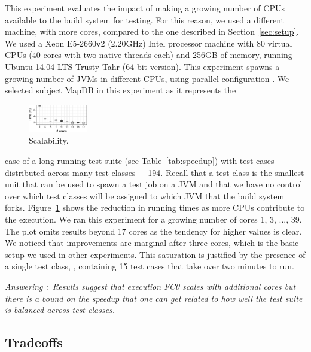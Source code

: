 \documentclass[10pt,journal,compsoc]{IEEEtran}
\begin{document}
\newcommand{\subjectScalability}{MapDB}

This experiment evaluates the impact of making a growing number of
CPUs available to the build system for testing.  For this reason, we
used a different machine, with more cores, compared to the one described in
Section~\ref{sec:setup}.  We used a Xeon E5-2660v2 (2.20GHz) Intel
processor machine with 80 virtual CPUs (40 cores with two native
threads each) and 256GB of memory, running Ubuntu 14.04 LTS Trusty
Tahr (64-bit version). This experiment
spawns a growing number of JVMs in different CPUs, using parallel
configuration \emph{\ForkSeq{}}. We selected
subject \subjectScalability{} in this experiment as it represents the
\begin{figure}
  \includegraphics[width=0.23\textwidth]{R/scalability/scalability.pdf}
  \caption{\label{fig:scalability}Scalability.}
  \vspace{-4mm}
\end{figure}
case of a long-running test suite (see Table~\ref{tab:speedup}) with
test cases distributed across many test classes~--~194.  
Recall that a test class is the smallest unit that can be used to spawn a test job
on a JVM and that we have no control over which test classes will be
assigned to which JVM that the build system forks.
Figure~\ref{fig:scalability} shows the reduction in running times as
more CPUs contribute to the execution.
We ran this experiment for a growing number of cores 1, 3, ..., 39. 
The plot omits results beyond 17 cores as the tendency for higher
values is clear.
We noticed that improvements are marginal after three cores, which is
the basic setup we used in other experiments.
This saturation is justified by the presence of a single test class,
, containing 15 test cases that take over
two minutes to run.

\begin{mdframed}
\noindent\textit{Answering \numRQSpeedupTwo{}:}~\emph{Results suggest that
  execution FC0 scales with additional cores but there is a bound
  on the speedup that one can get related to how well the test suite is
  balanced across test classes.}
\end{mdframed}

\subsection{Tradeoffs}
\label{sec:rq6-tradeoffs}
\end{document}
